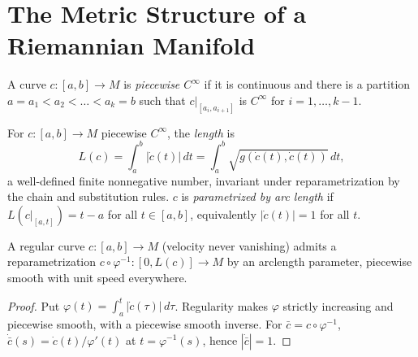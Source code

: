 \section{The Metric Structure of a Riemannian Manifold}

\begin{definition}
  \label{def:pet-ch5-piecewise-smooth-curve}
  \leanok
  A curve $c:[a,b]\to M$ is \emph{piecewise $C^\infty$} if it is continuous and there
  is a partition $a=a_1<a_2<\dots<a_k=b$ such that $c|_{[a_i,a_{i+1}]}$ is $C^\infty$
  for $i=1,\dots,k-1$.
\end{definition}

\begin{definition}
  \label{def:pet-ch5-curve-length}
  \leanok
  For $c:[a,b]\to M$ piecewise $C^\infty$, the \emph{length} is
  \[
    L(c)=\int_a^b|\dot c(t)|\,dt=\int_a^b\sqrt{g(\dot c(t),\dot c(t))}\,dt,
  \]
  a well-defined finite nonnegative number, invariant under reparametrization by the
  chain and substitution rules. $c$ is \emph{parametrized by arc length} if
  $L(c|_{[a,t]})=t-a$ for all $t\in[a,b]$, equivalently $|\dot c(t)|=1$ for all $t$.
\end{definition}

\begin{proposition}
  \label{prop:pet-ch5-arclength-reparametrization}
  \leanok
  A regular curve $c:[a,b]\to M$ (velocity never vanishing) admits a reparametrization
  $c\circ\varphi^{-1}:[0,L(c)]\to M$ by an arclength parameter, piecewise smooth with
  unit speed everywhere.
\end{proposition}
\begin{proof}
  \leanok
  \sketch
  Put $\varphi(t)=\int_a^t|\dot c(\tau)|\,d\tau$.  Regularity makes
  $\varphi$ strictly increasing and piecewise smooth, with a piecewise smooth
  inverse.  For $\bar c=c\circ\varphi^{-1}$,
  $\dot{\bar c}(s)=\dot c(t)/\varphi'(t)$ at $t=\varphi^{-1}(s)$, hence
  $|\dot{\bar c}|=1$.
\end{proof}

